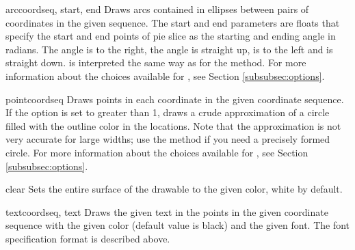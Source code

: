 \begin{methoddesc}{arc}{coordseq, start, end}
Draws arcs contained in ellipses between pairs of coordinates in
the given sequence. The start and end parameters are floats that
specify the start and end points of pie slice as the starting and
ending angle in radians. The angle  is to the right, the angle
 is straight up,  is to the left and
is straight down.  is interpreted the same way as for
the  method.  For more information about the choices
available for , see Section
\ref{subsubsec:options}.
\end{methoddesc}

\begin{methoddesc}{point}{coordseq}
Draws points in each coordinate in the given coordinate sequence. If the 
 option is set to greater than 1, draws a crude approximation 
of a circle filled with the outline color in the locations. Note that
the approximation is not very accurate for large widths; use the
 method if you need a precisely formed circle. 
For more information about the choices
available for , see Section
\ref{subsubsec:options}.
\end{methoddesc}

\begin{methoddesc}{clear}{}
Sets the entire surface of the drawable to the given color, white by 
default.
\end{methoddesc}

\begin{methoddesc}{text}{coordseq, text}
Draws the given text in the points in the given coordinate sequence
with the given color (default value is black) and the given font. The
font specification format is described above.
\end{methoddesc}

